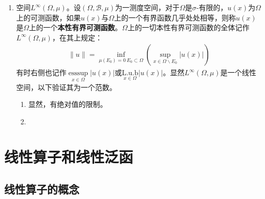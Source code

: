 \begin{enumerate}[leftmargin=2cm, label=\arabic*]
    \item 空间$L^{\infty}(\Omega,\mu)$。设$(\Omega,\mathscr{B},\mu)$为一测度空间，对于$\Omega$是$\sigma$-有限的，$u(x)$为$\Omega$上的可测函数，如果$u(x)$与$\Omega$上的一个有界函数几乎处处相等，则称$u(x)$是$\Omega$上的一个\textbf{本性有界可测函数}。$\Omega$上的一切本性有界可测函数的全体记作$L^{\infty}(\Omega,\mu)$，在其上规定：
    \begin{align*}
        \|u\| = \inf\limits_{\mu(E_0) = 0\ E_0\subset\Omega} \left( \sup\limits_{x\in\Omega\backslash E_0} |u(x)| \right)
    \end{align*}
    有时右侧也记作$\underset{x\in\Omega}{\text{ess}\sup} |u(x)|$或$\underset{x\in\Omega}{\text{L.u.b}} |u(x)|$。显然$L^{\infty}(\Omega,\mu)$是一个线性空间，以下验证其为一个范数。

    \begin{enumerate}[leftmargin=1cm, label=(\arabic*)]
        \item 显然，有绝对值的限制。
        \item 
    \end{enumerate}

    
    
\end{enumerate}


















\chapter{线性算子和线性泛函}

\section{线性算子的概念}
